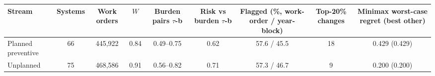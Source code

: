 \begin{tabular}{lcccccccc}
\toprule
Stream & Systems & Work orders & $W$ & Burden pairs $\tau$-b & Risk vs burden $\tau$-b & Flagged (\%, work-order / year-block) & Top-20\% changes & Minimax worst-case regret (best other) \\
\midrule
Planned preventive & 66 & 445,922 & 0.84 & 0.49--0.75 & 0.62 & 57.6 / 45.5 & 18 & 0.429 (0.429) \\
Unplanned & 75 & 468,586 & 0.91 & 0.56--0.82 & 0.71 & 57.3 / 46.7 & 9 & 0.200 (0.200) \\
\bottomrule
\end{tabular}
